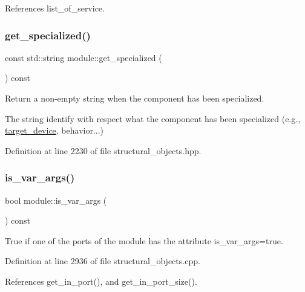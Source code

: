 References list\+\_\+of\+\_\+service.

\mbox{\label{classmodule_af39137fd66134483b603540dd742e9a5}} 
\subsubsection{\texorpdfstring{get\+\_\+specialized()}{get\_specialized()}}
{\footnotesize\ttfamily const std\+::string module\+::get\+\_\+specialized (\begin{DoxyParamCaption}{ }\end{DoxyParamCaption}) const\hspace{0.3cm}{\ttfamily [inline]}}



Return a non-\/empty string when the component has been specialized. 

The string identify with respect what the component has been specialized (e.\+g., \hyperlink{classtarget__device}{target\+\_\+device}, behavior...) 

Definition at line 2230 of file structural\+\_\+objects.\+hpp.

\mbox{\label{classmodule_ab08265f8bbd3fd2ce9abaf1fc4039044}} 
\subsubsection{\texorpdfstring{is\+\_\+var\+\_\+args()}{is\_var\_args()}}
{\footnotesize\ttfamily bool module\+::is\+\_\+var\+\_\+args (\begin{DoxyParamCaption}{ }\end{DoxyParamCaption}) const}



True if one of the ports of the module has the attribute is\+\_\+var\+\_\+args=true. 



Definition at line 2936 of file structural\+\_\+objects.\+cpp.



References get\+\_\+in\+\_\+port(), and get\+\_\+in\+\_\+port\+\_\+size().

